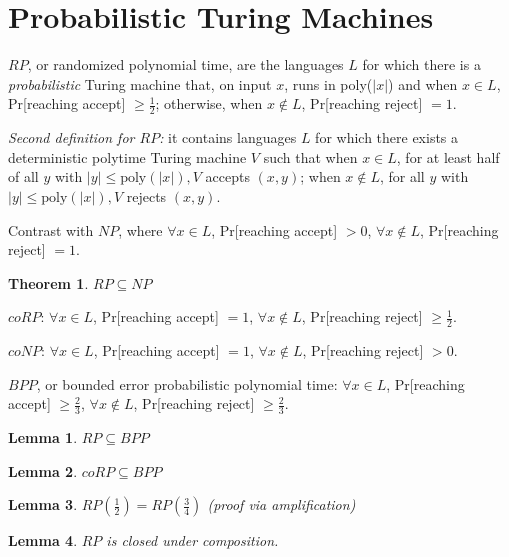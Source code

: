 \documentclass[letterpaper,landscape,11pt]{article}
\newtheorem{theorem}{Theorem}
\newtheorem{lemma}{Lemma}
\begin{document}
\section{Probabilistic Turing Machines}

$RP$, or randomized polynomial time, are the languages $L$ for which there is a \emph{probabilistic} Turing machine that, on input $x$, runs in poly($|x|$) and when $x \in L$, Pr[reaching accept] $\geq \frac{1}{2}$; otherwise, when $x \notin L$, Pr[reaching reject] $ = 1$.

\emph{Second definition for $RP$:} it contains languages $L$ for which there exists a deterministic polytime Turing machine $V$ such that when $x \in L$, for at least half of all $y$ with $|y| \leq \text{poly}(|x|), V$ accepts $(x, y)$; when $x \notin L$, for all $y$ with $|y| \leq \text{poly}(|x|), V$ rejects $(x, y)$.

Contrast with $NP$, where $\forall x \in L$, Pr[reaching accept] $ > 0$, $\forall x \notin L$, Pr[reaching reject] $ = 1$.

\begin{theorem}
	$RP \subseteq NP$
\end{theorem}

$coRP$: $\forall x \in L$, Pr[reaching accept] $ = 1$, $\forall x \notin L$, Pr[reaching reject] $\geq \frac{1}{2}$.

$coNP$: $\forall x \in L$, Pr[reaching accept] $ = 1$, $\forall x \notin L$, Pr[reaching reject] $> 0$.

$BPP$, or bounded error probabilistic polynomial time: $\forall x \in L$, Pr[reaching accept] $\geq \frac{2}{3}$, $\forall x \notin L$, Pr[reaching reject] $\geq \frac{2}{3}$.

\begin{lemma}
	$RP \subseteq BPP$
\end{lemma}

\begin{lemma}
	$coRP \subseteq BPP$
\end{lemma}

\begin{lemma}
	$RP(\frac{1}{2}) = RP(\frac{3}{4})$ (proof via amplification)
\end{lemma}

\begin{lemma}
	$RP$ is closed under composition.
\end{lemma}
\end{document}
